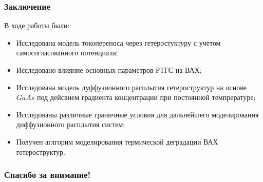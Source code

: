 \documentclass[10pt,pdf,hyperref={unicode},aspectratio={169}]{beamer}
\begin{document}
\begin{frame}
	\frametitle{Заключение}
	В ходе работы были:
	\begin{itemize}
		\item Исследована модель токопереноса через гетеростуктуру с учетом самосогласованного потенциала;
		\item Исследовано влияние основных параметров РТГС на ВАХ; 
		\item Исследована модель дуффузионного расплытия гетероструктур на основе $GaAs$ под дейсвием градиента концентрации при постоянной темпрературе;
		\item Исследованы различные граничные условия для дальнейшего моделирования диффузионного расплытия систем; 
		\item Получен аглгорим моделирования термической деградации ВАХ гетероструктур.
	\end{itemize}
\end{frame}

\begin{frame}
	\frametitle{Спасибо за внимание!}
\end{frame}
\end{document}
